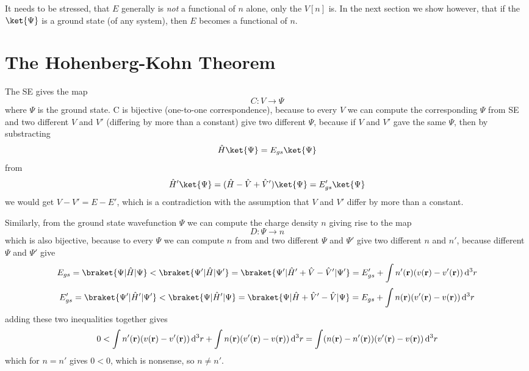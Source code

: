 It needs to be stressed, that $E$ generally is {\it not\/} a functional of $n$
alone, only the $V[n]$ is. In the next section we show however, that if 
the $\ket{\Psi}$ is a ground state (of any system), then $E$ becomes a
functional of $n$.

\section{The Hohenberg-Kohn Theorem}

The SE gives the map
$$C: V \to \Psi$$
where $\Psi$ is the ground state.
C is bijective (one-to-one correspondence), because to every $V$ we can compute the corresponding $\Psi$
from SE and two different $V$ and $V'$ (differing by more than a constant) give
two different $\Psi$, because if $V$ and $V'$ gave the same $\Psi$, then by
substracting
$$\hat H\ket{\Psi}=E_{gs}\ket{\Psi}$$
from
$$\hat H'\ket{\Psi}=(\hat H-\hat V+\hat V')\ket{\Psi}=E_{gs}'\ket{\Psi}$$
we would get $V-V'=E-E'$, which is a contradiction with the assumption that $V$
and $V'$ differ by more than a constant.

Similarly, from the ground state wavefunction $\Psi$ we can compute the charge
density $n$ giving rise to the
map
$$D: \Psi \to n$$ which is also bijective, because to every $\Psi$ we can
compute $n$ from  and two different $\Psi$ and $\Psi'$ give
two different $n$ and $n'$, because different $\Psi$ and $\Psi'$ give
$$E_{gs}=\braket{\Psi|\hat H|\Psi}<\braket{\Psi'|\hat H|\Psi'}=
\braket{\Psi'|\hat H'+\hat V-\hat V'|\Psi'}=E_{gs}'+\int n'({\bf r})
(v({\bf r})-v'({\bf r}))\,\d^3 r$$
$$E_{gs}'=\braket{\Psi'|\hat H'|\Psi'}<\braket{\Psi|\hat H'|\Psi}=
\braket{\Psi|\hat H+\hat V'-\hat V|\Psi}=E_{gs}+\int n({\bf r})
(v'({\bf r})-v({\bf r}))\,\d^3 r$$
adding these two inequalities together gives
$$0<\int n'({\bf r}) (v({\bf r})-v'({\bf r}))\,{\rm d}^3 r + 
\int n({\bf r}) (v'({\bf r})-v({\bf r}))\,{\rm d}^3 r=
\int (n({\bf r})-n'({\bf r}))(v'({\bf r})-v({\bf r}))\,{\rm d}^3 r$$
which for $n=n'$ gives $0<0$, which is nonsense, so $n\neq n'$.

